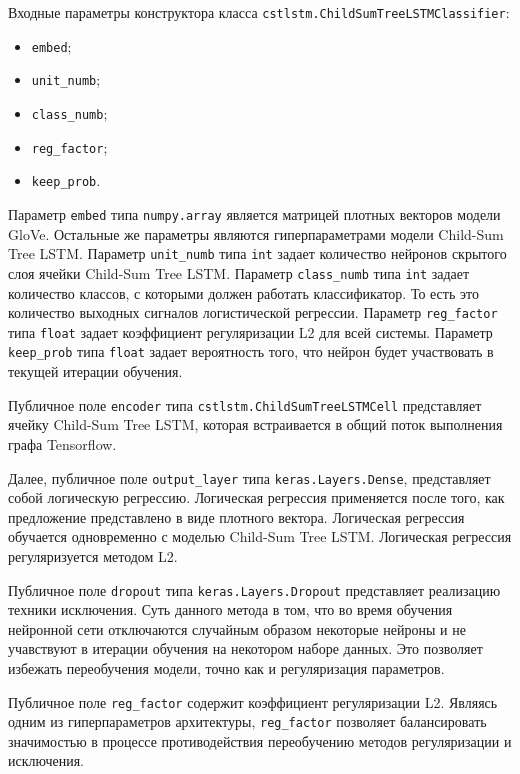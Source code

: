 Входные параметры конструктора класса \texttt{cstlstm.ChildSumTreeLSTM\-Classifier}:
\begin{itemize}
\item \texttt{embed};
\item \texttt{unit\_numb};
\item \texttt{class\_numb};
\item \texttt{reg\_factor};
\item \texttt{keep\_prob}.
\end{itemize}

Параметр \texttt{embed} типа \texttt{numpy.array} является матрицей плотных векторов модели GloVe. Остальные же параметры являются гиперпараметрами модели Child-Sum Tree LSTM\@. Параметр \texttt{unit\_numb} типа \texttt{int} задает количество нейронов скрытого слоя ячейки Child-Sum Tree LSTM\@. Параметр \texttt{class\_numb} типа \texttt{int} задает количество классов, с которыми должен работать классификатор. То есть это количество выходных сигналов логистической регрессии. Параметр \texttt{reg\_factor} типа \texttt{float} задает коэффициент регуляризации L2 для всей системы. Параметр \texttt{keep\_prob} типа \texttt{float} задает вероятность того, что нейрон будет участвовать в текущей итерации обучения.

Публичное поле \texttt{encoder} типа \texttt{cstlstm.ChildSumTreeLSTMCell} представляет ячейку Child-Sum Tree LSTM, которая встраивается в общий поток выполнения графа Tensorflow.

Далее, публичное поле \texttt{output\_layer} типа \texttt{keras.Layers.Dense}, представляет собой логическую регрессию. Логическая регрессия применяется после того, как предложение представлено в виде плотного вектора. Логическая регрессия обучается одновременно с моделью Child-Sum Tree LSTM\@. Логическая регрессия регуляризуется методом L2.

Публичное поле \texttt{dropout} типа \texttt{keras.Layers.Dropout} представляет реализацию техники исключения. Суть данного метода в том, что во время обучения нейронной сети отключаются случайным образом некоторые нейроны и не учавствуют в итерации обучения на некотором наборе данных. Это позволяет избежать переобучения модели, точно как и регуляризация параметров.

Публичное поле \texttt{reg\_factor} содержит коэффициент регуляризации L2. Являясь одним из гиперпараметров архитектуры, \texttt{reg\_factor} позволяет балансировать значимостью в процессе противодействия переобучению методов регуляризации и исключения.

